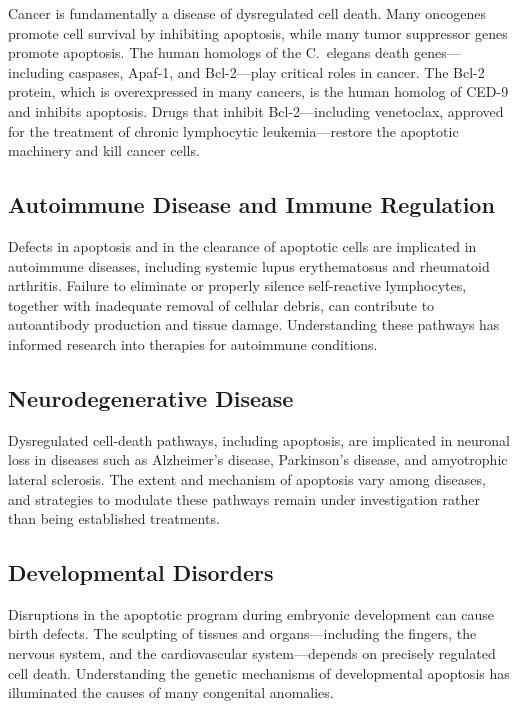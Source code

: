 Cancer is fundamentally a disease of dysregulated cell death. Many oncogenes promote cell survival by inhibiting apoptosis, while many tumor suppressor genes promote apoptosis. The human homologs of the C.\ elegans death genes---including caspases, Apaf-1, and Bcl-2---play critical roles in cancer. The Bcl-2 protein, which is overexpressed in many cancers, is the human homolog of CED-9 and inhibits apoptosis. Drugs that inhibit Bcl-2---including venetoclax, approved for the treatment of chronic lymphocytic leukemia---restore the apoptotic machinery and kill cancer cells.

\subsection{Autoimmune Disease and Immune Regulation}

Defects in apoptosis and in the clearance of apoptotic cells are implicated in autoimmune diseases, including systemic lupus erythematosus and rheumatoid arthritis. Failure to eliminate or properly silence self-reactive lymphocytes, together with inadequate removal of cellular debris, can contribute to autoantibody production and tissue damage. Understanding these pathways has informed research into therapies for autoimmune conditions.

\subsection{Neurodegenerative Disease}

Dysregulated cell-death pathways, including apoptosis, are implicated in neuronal loss in diseases such as Alzheimer's disease, Parkinson's disease, and amyotrophic lateral sclerosis. The extent and mechanism of apoptosis vary among diseases, and strategies to modulate these pathways remain under investigation rather than being established treatments.

\subsection{Developmental Disorders}

Disruptions in the apoptotic program during embryonic development can cause birth defects. The sculpting of tissues and organs---including the fingers, the nervous system, and the cardiovascular system---depends on precisely regulated cell death. Understanding the genetic mechanisms of developmental apoptosis has illuminated the causes of many congenital anomalies.

